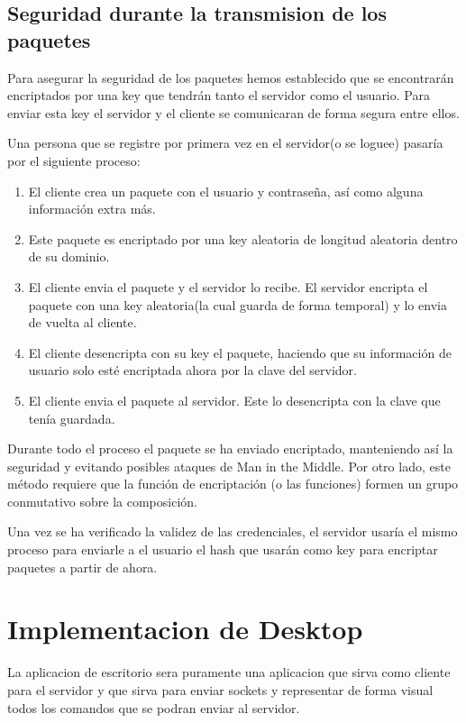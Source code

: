 \documentclass{article}
\theoremstyle{definition}
\begin{document}
\subsection{Seguridad durante la transmision de los paquetes}

Para asegurar la seguridad de los paquetes hemos establecido que se encontrarán encriptados por una key que tendrán tanto el servidor como el usuario. Para enviar esta key el servidor y el cliente se comunicaran de forma segura entre ellos. 

Una persona que se registre por primera vez en el servidor(o se loguee) pasaría por el siguiente proceso:

\begin{enumerate}
\item El cliente crea un paquete con el usuario y contraseña, así como alguna información extra más. \item Este paquete es encriptado por una key aleatoria de longitud aleatoria dentro de su dominio. 
\item El cliente envia el paquete y el servidor lo recibe. El servidor encripta el paquete con una key aleatoria(la cual guarda de forma temporal) y lo envia de vuelta al cliente.
\item El cliente desencripta con su key el paquete, haciendo que su información de usuario solo esté encriptada ahora por la clave del servidor.
\item El cliente envia el paquete al servidor. Este lo desencripta con la clave que tenía guardada.
\end{enumerate}

Durante todo el proceso el paquete se ha enviado encriptado, manteniendo así la seguridad y evitando posibles ataques de Man in the Middle. Por otro lado, este método requiere que la función de encriptación (o las funciones) formen un grupo conmutativo sobre la composición.

Una vez se ha verificado la validez de las credenciales, el servidor usaría el mismo proceso para enviarle a el usuario el hash que usarán como key para encriptar paquetes a partir de ahora.


\section{Implementacion de Desktop}

La aplicacion de escritorio sera puramente una aplicacion que sirva como cliente para el servidor y que sirva para enviar sockets y representar de forma visual todos los comandos que se podran enviar al servidor.
\end{document}
